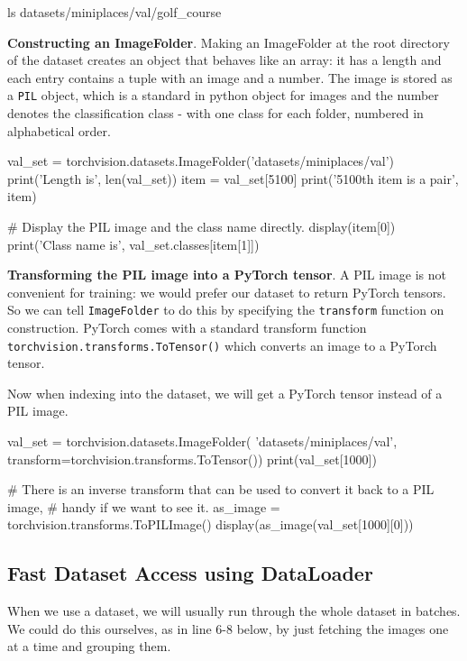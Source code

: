\begin{codeblock}[language=python]
ls datasets/miniplaces/val/golf_course
\end{codeblock}

\textbf{Constructing an ImageFolder}. Making an ImageFolder at the root directory of the dataset creates an object that behaves like an array: it has a length and each entry contains a tuple with an image and a number. The image is stored as a \texttt{PIL} object, which is a standard in python object for images and the number denotes the classification class - with one class for each folder, numbered in alphabetical order. 

\begin{codeblock}[language=python]
val_set = torchvision.datasets.ImageFolder('datasets/miniplaces/val')
print('Length is', len(val_set))
item = val_set[5100]
print('5100th item is a pair', item)

# Display the PIL image and the class name directly.
display(item[0])
print('Class name is', val_set.classes[item[1]])
\end{codeblock}

\textbf{Transforming the PIL image into a PyTorch tensor}. A PIL image is not convenient for training: we would prefer our dataset to return PyTorch tensors. So we can tell \texttt{ImageFolder} to do this by specifying the \texttt{transform} function on construction. PyTorch comes with a standard transform function \texttt{torchvision.transforms.ToTensor()} which converts an image to a PyTorch tensor. 

Now when indexing into the dataset, we will get a PyTorch tensor instead of a PIL image. 

\begin{codeblock}[language=python]
val_set =  torchvision.datasets.ImageFolder(
    'datasets/miniplaces/val',
    transform=torchvision.transforms.ToTensor())
print(val_set[1000])

# There is an inverse transform that can be used to convert it back to a PIL image,
# handy if we want to see it.
as_image = torchvision.transforms.ToPILImage()
display(as_image(val_set[1000][0]))
\end{codeblock}

\subsection{Fast Dataset Access using DataLoader}

When we use a dataset, we will usually run through the whole dataset in batches. We could do this ourselves, as in line 6-8 below, by just fetching the images one at a time and grouping them. 


